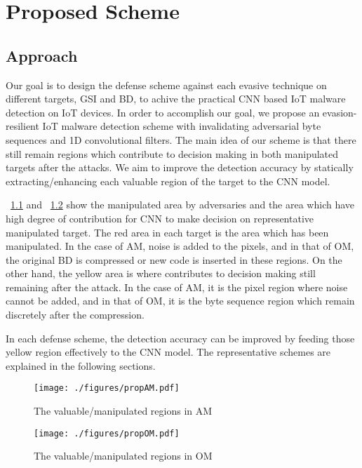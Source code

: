 \chapter{Proposed Scheme}\label{sec:proposed_scheme}

\section{Approach}
Our goal is to design the defense scheme against each evasive technique on different targets, GSI and BD, to achive the practical CNN based IoT malware detection on IoT devices.
In order to accomplish our goal, we propose an evasion-resilient IoT malware detection scheme with invalidating adversarial byte sequences and 1D convolutional filters.  
The main idea of our scheme is that there still remain regions which contribute to decision making in both manipulated targets after the attacks.
We aim to improve the detection accuracy by statically extracting/enhancing each valuable region of the target to the CNN model.

\figurename~\ref{fig:propAM} and \figurename~\ref{fig:propOM} show the manipulated area by adversaries and the area which have high degree of contribution for CNN to make decision on representative manipulated target.
The red area in each target is the area which has been manipulated.
In the case of AM, noise is added to the pixels, and in that of OM, the original BD is compressed or new code is inserted in these regions.
On the other hand, the yellow area is where contributes to decision making still remaining after the attack.
In the case of AM, it is the pixel region where noise cannot be added, and in that of OM, it is the byte sequence region which remain discretely after the compression.

In each defense scheme, the detection accuracy can be improved by feeding those yellow region effectively to the CNN model.
The representative schemes are explained in the following sections.

\begin{figure}[p]
 \centering
 \hspace{-55pt}
 \texttt{[image: ./figures/propAM.pdf]}
 \caption{The valuable/manipulated regions in AM} 
 \label{fig:propAM}
\end{figure}
\begin{figure}[p]
 \centering
 \hspace{-100pt}
 \texttt{[image: ./figures/propOM.pdf]}
 \caption{The valuable/manipulated regions in OM} 
 \label{fig:propOM}
\end{figure}
\afterpage{\clearpage}
\newpage

